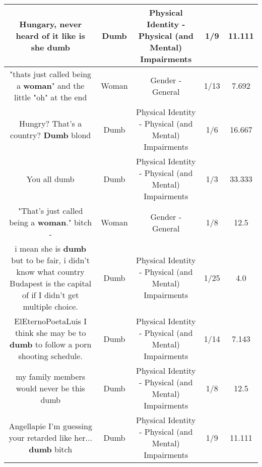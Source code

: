 \documentclass[11pt]{article}
\newlength\mylength
\begin{document}
\begin{center}
\begin{longtable}{|C{.65\mylength}|C{.30\mylength}|C{.12\mylength}|C{.12\mylength}|C{.12\mylength}|}
  \small Hungary, never heard of it like is she dumb\normalsize   & Dumb & Physical Identity - Physical (and Mental) Impairments & 1/9 & 11.111 \\  \hline
  \small "thats just called being a \textbf{woman}" and the little "oh" at the end\normalsize   & Woman & Gender - General & 1/13 & 7.692 \\  \hline
  \small Hungry? That's a country? \textbf{Dumb} blond\normalsize   & Dumb & Physical Identity - Physical (and Mental) Impairments & 1/6 & 16.667 \\  \hline
  \small You all dumb\normalsize   & Dumb & Physical Identity - Physical (and Mental) Impairments & 1/3 & 33.333 \\  \hline
  \small "That's just called being a \textbf{woman}." bitch -\normalsize   & Woman & Gender - General & 1/8 & 12.5 \\  \hline
  \small i mean she is \textbf{dumb} but to be fair, i didn't know what country Budapest is the capital of if I didn't get multiple choice.\normalsize   & Dumb & Physical Identity - Physical (and Mental) Impairments & 1/25 & 4.0 \\  \hline
  \small ElEternoPoetaLuis I think she may be to \textbf{dumb} to follow a porn shooting schedule.\normalsize   & Dumb & Physical Identity - Physical (and Mental) Impairments & 1/14 & 7.143 \\  \hline
  \small my family members would never be this dumb\normalsize   & Dumb & Physical Identity - Physical (and Mental) Impairments & 1/8 & 12.5 \\  \hline
  \small Angellapie I'm guessing your retarded like her... \textbf{dumb} bitch\normalsize   & Dumb & Physical Identity - Physical (and Mental) Impairments & 1/9 & 11.111 \\  \hline

\end{longtable}
\end{center}
\end{document}
